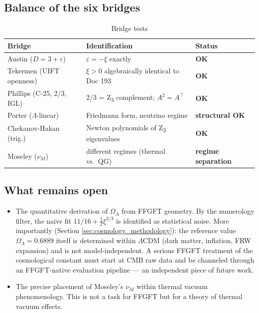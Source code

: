 \subsection{Balance of the six bridges}

\begin{table}[h]
\centering
\caption{Bridge tests}
\begin{tabular}{lll}
\toprule
Bridge & Identification & Status \\
\midrule
Austin (\(D = 3 + \varepsilon\)) & \(\varepsilon = -\xi\) exactly & {\color{t0green}\textbf{OK}} \\
Tekermen (UIFT openness) & \(\xi > 0\) algebraically identical to Doc 193 & {\color{t0green}\textbf{OK}} \\
Phillips (C-25, 2/3, IGL) & 2/3 = Z\textsubscript{3} complement; \(A^2 = A^\top\) & {\color{t0green}\textbf{OK}} \\
Porter (\(\Lambda\)-linear) & Friedmann form, neutrino regime & {\color{t0blue}\textbf{structural OK}} \\
Chekanov-Hakan (trig.) & Newton polynomials of Z\textsubscript{3} eigenvalues & {\color{t0green}\textbf{OK}} \\
Moseley (\(\nu_M\)) & different regimes (thermal vs.\ QG) & {\color{t0gray}\textbf{regime separation}} \\
\bottomrule
\end{tabular}
\end{table}

\subsection{What remains open}

\begin{itemize}
\item The quantitative derivation of \(\Omega_\Lambda\) from FFGFT geometry. By the numerology filter, the naive fit \(11/16 + \tfrac{1}{2}\xi^{2/3}\) is identified as statistical noise. More importantly (Section \ref{sec:cosmology_methodology}): the reference value \(\Omega_\Lambda = 0.6889\) itself is determined within \(\Lambda\)CDM (dark matter, inflation, FRW expansion) and is not model-independent. A serious FFGFT treatment of the cosmological constant must start at CMB raw data and be channeled through an FFGFT-native evaluation pipeline --- an independent piece of future work.
\item The precise placement of Moseley's \(\nu_M\) within thermal vacuum phenomenology. This is not a task for FFGFT but for a theory of thermal vacuum effects.
\end{itemize}

